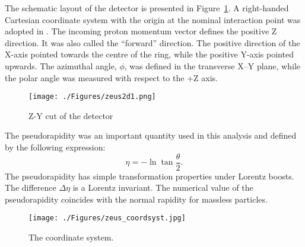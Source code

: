The schematic layout of the \zeus detector is presented in Figure~\ref{fig:zeus2d1}. A right-handed Cartesian coordinate system with the origin at the nominal interaction point was adopted in \zeus. The incoming proton momentum vector defines the positive Z direction. It was also called the ``forward'' direction. The positive direction of the X-axis pointed towards the centre of the \hera ring, while the positive Y-axis pointed upwards. The azimuthal angle, $\phi$, was defined in the transverse X--Y plane, while the polar angle was measured with respect to the +Z axis. 
\begin{landscape}
\begin{figure}[htpb]
	\centering
		\texttt{[image: ./Figures/zeus2d1.png]}
	\caption{Z-Y cut of the \zeus detector}
	\label{fig:zeus2d1}
\end{figure}
\end{landscape}

The pseudorapidity was an important quantity used in this analysis and defined by the following expression:
\begin{equation}
\eta = -\ln \tan \dfrac{\theta}{2}.
\end{equation}
The pseudorapidity has simple transformation properties under Lorentz boosts. The difference $\Delta \eta$ is a Lorentz invariant. The numerical value of the pseudorapidity coincides with the normal rapidity for massless particles.
\begin{figure}[htpb]
	\centering
		\texttt{[image: ./Figures/zeus\_coordsyst.jpg]}
	\caption{The \zeus coordinate system.}
	\label{fig:zeus_coordsyst}
\end{figure}

